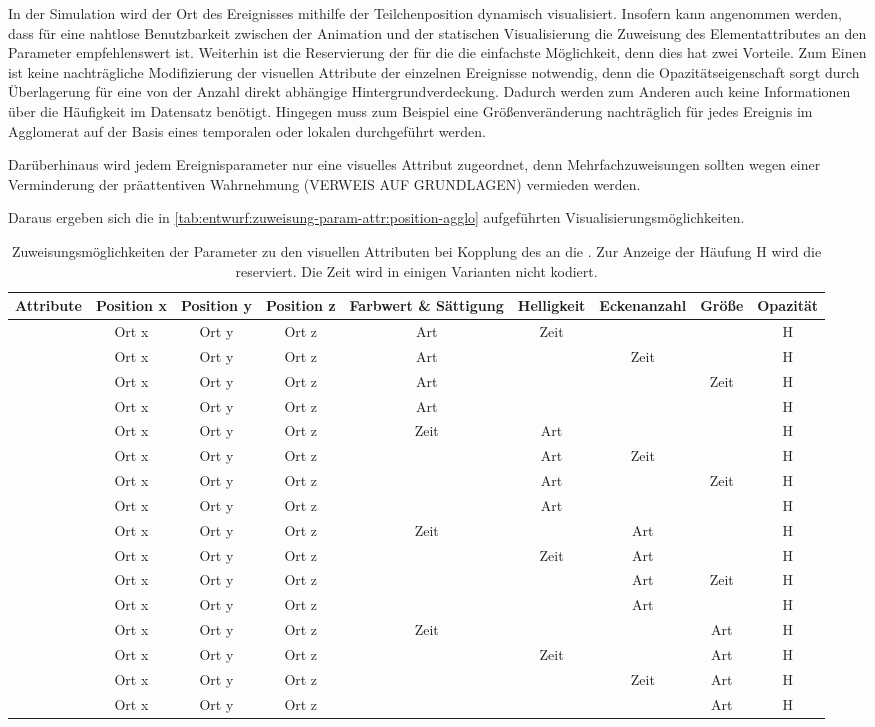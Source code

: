 In der  Simulation wird der Ort des Ereignisses mithilfe der Teilchenposition dynamisch visualisiert. Insofern kann angenommen werden, dass für eine nahtlose Benutzbarkeit zwischen der  Animation und der statischen Visualisierung die Zuweisung des Elementattributes  an den Parameter  empfehlenswert ist. Weiterhin ist die Reservierung der  für die  die einfachste Möglichkeit, denn dies hat zwei Vorteile. Zum Einen ist keine nachträgliche Modifizierung der visuellen Attribute der einzelnen Ereignisse notwendig, denn die Opazitätseigenschaft sorgt durch Überlagerung für eine von der Anzahl direkt abhängige Hintergrundverdeckung. Dadurch werden zum Anderen auch keine Informationen über die Häufigkeit im Datensatz benötigt. Hingegen muss zum Beispiel eine Größenveränderung nachträglich für jedes Ereignis im Agglomerat auf der Basis eines temporalen oder lokalen  durchgeführt werden.

Darüberhinaus wird jedem Ereignisparameter nur eine visuelles Attribut zugeordnet, denn Mehrfachzuweisungen sollten wegen einer Verminderung der präattentiven Wahrnehmung (VERWEIS AUF GRUNDLAGEN) vermieden werden.

Daraus ergeben sich die in \autoref{tab:entwurf:zuweisung-param-attr:position-agglo} aufgeführten Visualisierungsmöglichkeiten.

\begin{table} 
	\begin{tabularx}{\textwidth}{@{}CCCCCCCCC@{}}
		\toprule
		Attribute & Position x & Position y & Position z & Farbwert \& Sättigung & Helligkeit & Eckenanzahl & Größe & Opazität \tabularnewline
		\midrule
		& Ort x & Ort y & Ort z & Art & Zeit & & & H \tabularnewline
		& Ort x & Ort y & Ort z & Art & & Zeit & & H \tabularnewline 
		& Ort x & Ort y & Ort z & Art & & & Zeit & H \tabularnewline 
		& Ort x & Ort y & Ort z & Art & & & & H \tabularnewline 
		\midrule
		& Ort x & Ort y & Ort z & Zeit & Art & & & H \tabularnewline 
		& Ort x & Ort y & Ort z & & Art & Zeit & & H \tabularnewline
		& Ort x & Ort y & Ort z & & Art & & Zeit & H \tabularnewline 
		& Ort x & Ort y & Ort z & & Art & & & H \tabularnewline 
		\midrule
		& Ort x & Ort y & Ort z & Zeit & & Art & & H \tabularnewline 
		& Ort x & Ort y & Ort z & & Zeit & Art & & H \tabularnewline 
		& Ort x & Ort y & Ort z & & & Art & Zeit & H  \tabularnewline
		& Ort x & Ort y & Ort z & & & Art & & H  \tabularnewline
		\midrule
		& Ort x & Ort y & Ort z & Zeit & & & Art & H \tabularnewline 
		& Ort x & Ort y & Ort z & & Zeit & & Art & H \tabularnewline 
		& Ort x & Ort y & Ort z & & & Zeit & Art & H \tabularnewline 
		& Ort x & Ort y & Ort z & & & & Art & H \tabularnewline 
		\bottomrule
	\end{tabularx}
	\caption{Zuweisungsmöglichkeiten der Parameter zu den visuellen Attributen bei Kopplung des  an die . Zur Anzeige der Häufung H wird die  reserviert. Die Zeit wird in einigen Varianten nicht kodiert.}\label{tab:entwurf:zuweisung-param-attr:position-agglo}
\end{table}

